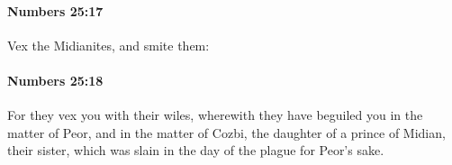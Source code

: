 		\paragraph{Numbers 25:17} %
			\label{NUMBERS-25-17}

			Vex the Midianites, and smite them:


		\paragraph{Numbers 25:18} %
			\label{NUMBERS-25-18}

			For they vex you with their wiles, wherewith they have beguiled you in the matter of Peor, and in the matter of Cozbi, the daughter of a prince of Midian, their sister, which was slain in the day of the plague for Peor’s sake.

